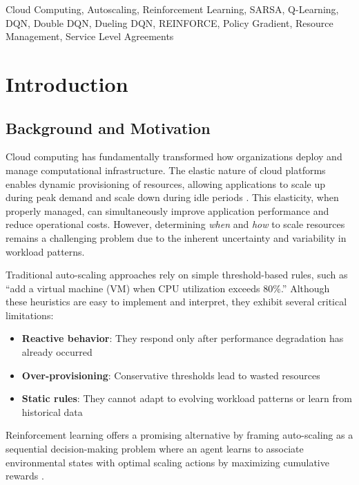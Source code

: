 \documentclass[conference]{IEEEtran}
\begin{document}
\begin{IEEEkeywords}
Cloud Computing, Autoscaling, Reinforcement Learning, SARSA, Q-Learning, DQN, Double DQN, Dueling DQN, REINFORCE, Policy Gradient, Resource Management, Service Level Agreements
\end{IEEEkeywords}

\section{Introduction}

\subsection{Background and Motivation}
Cloud computing has fundamentally transformed how organizations deploy and manage computational infrastructure. The elastic nature of cloud platforms enables dynamic provisioning of resources, allowing applications to scale up during peak demand and scale down during idle periods \cite{garcia2020}. This elasticity, when properly managed, can simultaneously improve application performance and reduce operational costs. However, determining \textit{when} and \textit{how} to scale resources remains a challenging problem due to the inherent uncertainty and variability in workload patterns.

Traditional auto-scaling approaches rely on simple threshold-based rules, such as ``add a virtual machine (VM) when CPU utilization exceeds 80\%.'' Although these heuristics are easy to implement and interpret, they exhibit several critical limitations:
\begin{itemize}
    \item \textbf{Reactive behavior}: They respond only after performance degradation has already occurred
    \item \textbf{Over-provisioning}: Conservative thresholds lead to wasted resources
    \item \textbf{Static rules}: They cannot adapt to evolving workload patterns or learn from historical data
\end{itemize}

Reinforcement learning offers a promising alternative by framing auto-scaling as a sequential decision-making problem where an agent learns to associate environmental states with optimal scaling actions by maximizing cumulative rewards \cite{sutton2018}.
\end{document}
